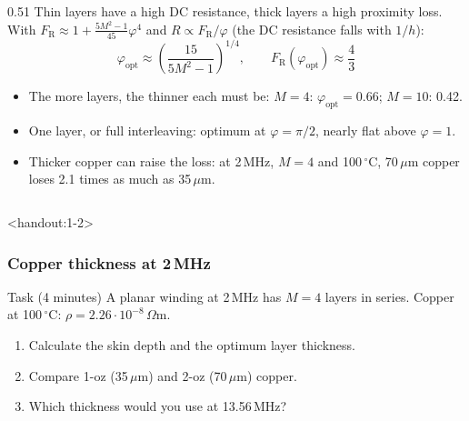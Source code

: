 \begin{frame}
\begin{columns}[T]
\begin{column}{0.51\textwidth}
			Thin layers have a high DC resistance, thick layers a high proximity loss. With $F_\mathrm{R}\approx1+\frac{5M^2-1}{45}\varphi^4$ and $R\propto F_\mathrm{R}/\varphi$ (the DC resistance falls with $1/h$):
			\begin{equation*}
				\varphi_\mathrm{opt}\approx\left(\frac{15}{5M^2-1}\right)^{1/4},\qquad F_\mathrm{R}(\varphi_\mathrm{opt})\approx\frac{4}{3}
			\end{equation*}
			\begin{itemize}
				\item The more layers, the thinner each must be: $M=4$: $\varphi_\mathrm{opt}=0.66$; $M=10$: 0.42.
				\item One layer, or full interleaving: optimum at $\varphi=\pi/2$, nearly flat above $\varphi=1$.
				\item Thicker copper can raise the loss: at 2\,MHz, $M=4$ and 100\,$^\circ$C, 70\,$\mu$m copper loses 2.1 times as much as 35\,$\mu$m.
			\end{itemize}
		\end{column}
	\end{columns}
\end{frame}

\begin{frame}<handout:1-2>
	\frametitle{Copper thickness at 2\,MHz}
	\begin{block}{Task (4 minutes)}
		A planar winding at 2\,MHz has $M=4$ layers in series. Copper at 100\,$^\circ$C: $\rho=2.26\cdot10^{-8}\,\Omega$m.
		\begin{enumerate}
			\item Calculate the skin depth and the optimum layer thickness.
			\item Compare 1-oz (35\,$\mu$m) and 2-oz (70\,$\mu$m) copper.
			\item Which thickness would you use at 13.56\,MHz?
		\end{enumerate}
	\end{block}
\end{frame}

